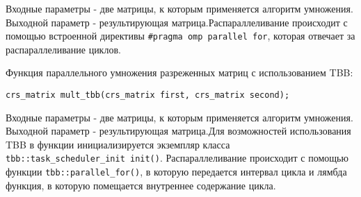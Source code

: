 \documentclass{report}
\begin{document}
Входные параметры - две матрицы, к которым применяется алгоритм умножения. Выходной параметр - результирующая матрица.\newline Распараллеливание происходит с помощью встроенной директивы  \verb|#pragma omp parallel for|, которая отвечает за распараллеливание циклов.
\par Функция параллельного умножения разреженных матриц с использованием TBB:
\begin{lstlisting}
crs_matrix mult_tbb(crs_matrix first, crs_matrix second);
\end{lstlisting}
Входные параметры - две матрицы, к которым применяется алгоритм умножения. Выходной параметр - результирующая матрица.\newline  Для возможностей использования TBB в функции инициализируется экземпляр класса \\\verb|tbb::task_scheduler_init init()|. Распараллеливание происходит с помощью функции \verb|tbb::parallel_for()|, в которую передается интервал цикла и лямбда функция, в которую помещается внутреннее содержание цикла. 
\newpage
\end{document}
